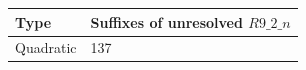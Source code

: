 \begin{center}\begin{tabular}{ll}\toprule Type & Suffixes of unresolved $R9\_2\_n$\\\midrule
Quadratic & 137\\
\bottomrule\end{tabular}\end{center}
